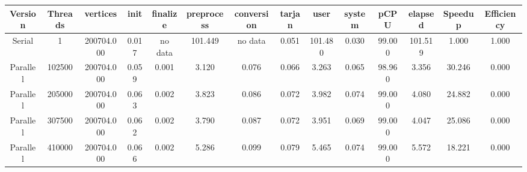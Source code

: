 \begin{tabular}{|c|c|c|c|c|c|c|c|c|c|c|c|c|c|}
\toprule
 Version &  Threads &   vertices &  init & finalize &  preprocess & conversion &  tarjan &    user &  system &   pCPU &  elapsed &  Speedup &  Efficiency \\
\midrule
  Serial &        1 & 200704.000 & 0.017 &  no data &     101.449 &    no data &   0.051 & 101.480 &   0.030 & 99.000 &  101.519 &    1.000 &       1.000 \\
Parallel &   102500 & 200704.000 & 0.059 &    0.001 &       3.120 &      0.076 &   0.066 &   3.263 &   0.065 & 98.960 &    3.356 &   30.246 &       0.000 \\
Parallel &   205000 & 200704.000 & 0.063 &    0.002 &       3.823 &      0.086 &   0.072 &   3.982 &   0.074 & 99.000 &    4.080 &   24.882 &       0.000 \\
Parallel &   307500 & 200704.000 & 0.062 &    0.002 &       3.790 &      0.087 &   0.072 &   3.951 &   0.069 & 99.000 &    4.047 &   25.086 &       0.000 \\
Parallel &   410000 & 200704.000 & 0.066 &    0.002 &       5.286 &      0.099 &   0.079 &   5.465 &   0.074 & 99.000 &    5.572 &   18.221 &       0.000 \\
\bottomrule
\end{tabular}
